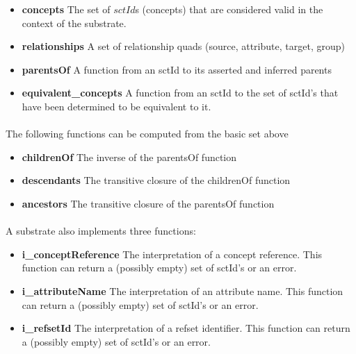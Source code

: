 \documentclass{article}
\begin{document}
\begin{itemize}[noitemsep,nolistsep]
\item{\textbf{concepts}} The set of $sctId$s (concepts) that are considered valid in the context of the substrate.  
\item{\textbf{relationships}} A set of relationship quads (source, attribute, target, group)
\item{\textbf{parentsOf}}  A function from an sctId to its asserted and inferred parents
\item{\textbf{equivalent\_concepts}} A function from an sctId to the set of sctId's that have been determined to be equivalent to it. 
\end{itemize}
\paragraph{}

The following functions can be computed from the basic set above
\begin{itemize}[noitemsep,nolistsep]
\item{\textbf{childrenOf}} The inverse of the parentsOf function
\item{\textbf{descendants}} The transitive closure of the childrenOf function
\item{\textbf{ancestors}} The transitive closure of the parentsOf function
\end{itemize}

\paragraph{}

A substrate also implements three functions:
\begin{itemize}[noitemsep,nolistsep]
\item{\textbf{i\_conceptReference}} The interpretation of a concept reference.  This function can return a (possibly empty) set of sctId's or an error.
\item{\textbf{i\_attributeName}} The interpretation of an attribute name.  This function can return a (possibly empty) set of sctId's or an error.
\item{\textbf{i\_refsetId}} The interpretation of a refset identifier.  This function can return a (possibly empty) set of sctId's or an error.
\end{itemize}
\end{document}
